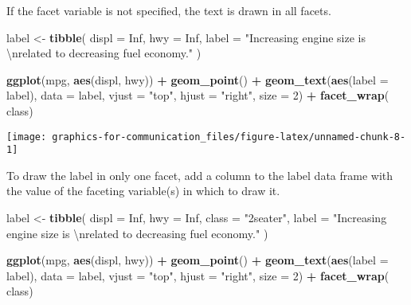 \documentclass[]{book}
\newenvironment{Shaded}{\begin{snugshade}}{\end{snugshade}}
\newcommand{\CharTok}[1]{\textcolor[rgb]{0.31,0.60,0.02}{#1}}
\newcommand{\DataTypeTok}[1]{\textcolor[rgb]{0.13,0.29,0.53}{#1}}
\newcommand{\DecValTok}[1]{\textcolor[rgb]{0.00,0.00,0.81}{#1}}
\newcommand{\KeywordTok}[1]{\textcolor[rgb]{0.13,0.29,0.53}{\textbf{#1}}}
\newcommand{\NormalTok}[1]{#1}
\newcommand{\OperatorTok}[1]{\textcolor[rgb]{0.81,0.36,0.00}{\textbf{#1}}}
\newcommand{\OtherTok}[1]{\textcolor[rgb]{0.56,0.35,0.01}{#1}}
\newcommand{\StringTok}[1]{\textcolor[rgb]{0.31,0.60,0.02}{#1}}
\theoremstyle{plain}
\theoremstyle{remark}
\begin{document}
If the facet variable is not specified, the text is drawn in all facets.

\begin{Shaded}
\begin{Highlighting}[]
\NormalTok{label <-}\StringTok{ }\KeywordTok{tibble}\NormalTok{(}
  \DataTypeTok{displ =} \OtherTok{Inf}\NormalTok{,}
  \DataTypeTok{hwy =} \OtherTok{Inf}\NormalTok{,}
  \DataTypeTok{label =} \StringTok{"Increasing engine size is }\CharTok{\textbackslash{}n}\StringTok{related to decreasing fuel economy."}
\NormalTok{)}

\KeywordTok{ggplot}\NormalTok{(mpg, }\KeywordTok{aes}\NormalTok{(displ, hwy)) }\OperatorTok{+}
\StringTok{  }\KeywordTok{geom_point}\NormalTok{() }\OperatorTok{+}
\StringTok{  }\KeywordTok{geom_text}\NormalTok{(}\KeywordTok{aes}\NormalTok{(}\DataTypeTok{label =}\NormalTok{ label), }\DataTypeTok{data =}\NormalTok{ label, }\DataTypeTok{vjust =} \StringTok{"top"}\NormalTok{, }\DataTypeTok{hjust =} \StringTok{"right"}\NormalTok{,}
            \DataTypeTok{size =} \DecValTok{2}\NormalTok{) }\OperatorTok{+}
\StringTok{  }\KeywordTok{facet_wrap}\NormalTok{(}\OperatorTok{~}\StringTok{ }\NormalTok{class)}
\end{Highlighting}
\end{Shaded}

\begin{center}\texttt{[image: graphics-for-communication\_files/figure-latex/unnamed-chunk-8-1]} \end{center}

To draw the label in only one facet, add a column to the label data
frame with the value of the faceting variable(s) in which to draw it.

\begin{Shaded}
\begin{Highlighting}[]
\NormalTok{label <-}\StringTok{ }\KeywordTok{tibble}\NormalTok{(}
  \DataTypeTok{displ =} \OtherTok{Inf}\NormalTok{,}
  \DataTypeTok{hwy =} \OtherTok{Inf}\NormalTok{,}
  \DataTypeTok{class =} \StringTok{"2seater"}\NormalTok{,}
  \DataTypeTok{label =} \StringTok{"Increasing engine size is }\CharTok{\textbackslash{}n}\StringTok{related to decreasing fuel economy."}
\NormalTok{)}

\KeywordTok{ggplot}\NormalTok{(mpg, }\KeywordTok{aes}\NormalTok{(displ, hwy)) }\OperatorTok{+}
\StringTok{  }\KeywordTok{geom_point}\NormalTok{() }\OperatorTok{+}
\StringTok{  }\KeywordTok{geom_text}\NormalTok{(}\KeywordTok{aes}\NormalTok{(}\DataTypeTok{label =}\NormalTok{ label), }\DataTypeTok{data =}\NormalTok{ label, }\DataTypeTok{vjust =} \StringTok{"top"}\NormalTok{, }\DataTypeTok{hjust =} \StringTok{"right"}\NormalTok{,}
            \DataTypeTok{size =} \DecValTok{2}\NormalTok{) }\OperatorTok{+}
\StringTok{  }\KeywordTok{facet_wrap}\NormalTok{(}\OperatorTok{~}\StringTok{ }\NormalTok{class)}
\end{Highlighting}
\end{Shaded}
\end{document}
